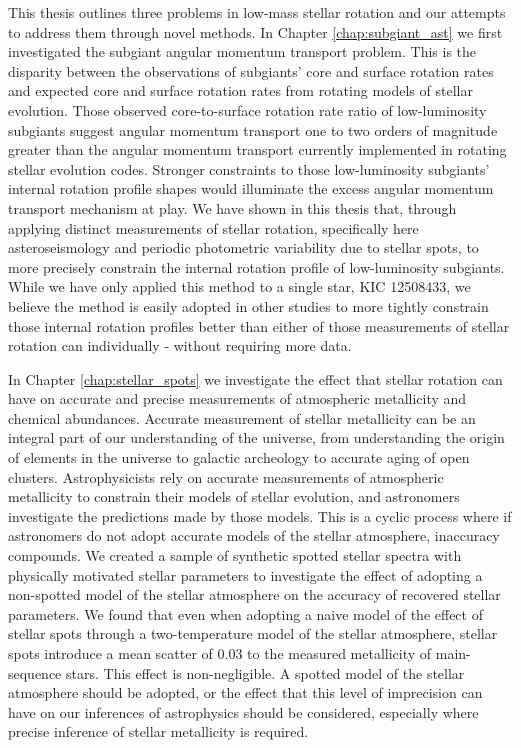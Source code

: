 This thesis outlines three problems in low-mass stellar rotation and our attempts to address them through novel methods.
In Chapter \ref{chap:subgiant_ast} we first investigated the subgiant angular momentum transport problem.
This is the disparity between the observations of subgiants' core and surface rotation rates and expected core and surface rotation rates from rotating models of stellar evolution.
Those observed core-to-surface rotation rate ratio of low-luminosity subgiants suggest angular momentum transport one to two orders of magnitude greater than the angular momentum transport currently implemented in rotating stellar evolution codes.
Stronger constraints to those low-luminosity subgiants' internal rotation profile shapes would illuminate the excess angular momentum transport mechanism at play.
We have shown in this thesis that, through applying distinct measurements of stellar rotation, specifically here asteroseismology and periodic photometric variability due to stellar spots, to more precisely constrain the internal rotation profile of low-luminosity subgiants.
While we have only applied this method to a single star, KIC 12508433, we believe the method is easily adopted in other studies to more tightly constrain those internal rotation profiles better than either of those measurements of stellar rotation can individually - without requiring more data.

In Chapter \ref{chap:stellar_spots} we investigate the effect that stellar rotation can have on accurate and precise measurements of atmospheric metallicity and chemical abundances.
Accurate measurement of stellar metallicity can be an integral part of our understanding of the universe, from understanding the origin of elements in the universe to galactic archeology to accurate aging of open clusters.
Astrophysicists rely on accurate measurements of atmospheric metallicity to constrain their models of stellar evolution, and astronomers investigate the predictions made by those models.
This is a cyclic process where if astronomers do not adopt accurate models of the stellar atmosphere, inaccuracy compounds.
We created a sample of synthetic spotted stellar spectra with physically motivated stellar parameters to investigate the effect of adopting a non-spotted model of the stellar atmosphere on the accuracy of recovered stellar parameters.
We found that even when adopting a naive model of the effect of stellar spots through a two-temperature model of the stellar atmosphere, stellar spots introduce a mean scatter of 0.03 to the measured metallicity of main-sequence stars.
This effect is non-negligible. 
A spotted model of the stellar atmosphere should be adopted, or the effect that this level of imprecision can have on our inferences of astrophysics should be considered, especially where precise inference of stellar metallicity is required.

